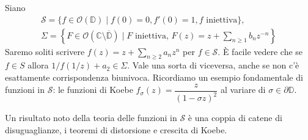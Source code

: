 Siano
\begin{gather*}
  \mathcal{S}=\{f \in \mathcal{O}(\mathbb{D}) \mid f(0)=0, f'(0)=1, f \text{ iniettiva}\}, \\
\Sigma=\left\{F \in \mathcal{O}(\mathbb{C}\setminus \overline{\mathbb{D}}) \mid F \text{ iniettiva, } F(z)=z+\sum_{n \ge 1}b_nz^{-n}\right\}
\end{gather*}
Saremo soliti scrivere $f(z)=\displaystyle z+\sum_{n \ge 2}a_nz^n$ per $f \in \mathcal{S}$. È facile vedere che se $f \in S$ allora $1/f(1/z)+a_2 \in \Sigma$. Vale una sorta di viceversa, anche se non c'è esattamente corrispondenza biunivoca. Ricordiamo un esempio fondamentale di funzioni in $\mathcal{S}$: le funzioni di Koebe $f_{\sigma}(z)=\dfrac{z}{(1-\sigma z)^2}$ al variare di $\sigma \in \partial \mathbb{D}$.

Un risultato noto della teoria delle funzioni in $\mathcal{S}$ è una coppia di catene di disuguaglianze, i teoremi di distorsione e crescita di Koebe.

